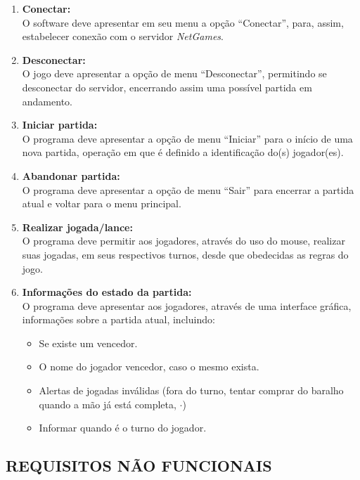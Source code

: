 \documentclass[12pt,a4paper,brazil,abntex2]{article}
\begin{document}
		\begin{enumerate}
			\item {\bf Conectar:}\\
				O software deve apresentar em seu menu a opção ``Conectar'', para, assim, estabelecer conexão com o servidor \textit{NetGames}.

			\item {\bf Desconectar:}\\
				O jogo deve apresentar a opção de menu ``Desconectar'', permitindo se desconectar do servidor, encerrando assim uma possível partida em andamento.
			
			\item {\bf Iniciar partida:}\\
				O programa deve apresentar a opção de menu ``Iniciar'' para o início de uma nova partida, operação em que é definido a identificação do(s) jogador(es).
			
			\item {\bf Abandonar partida:}\\
				O programa deve apresentar a opção de menu ``Sair'' para encerrar a partida atual e voltar para o menu principal.

			\item {\bf Realizar jogada/lance:}\\
				O programa deve permitir aos jogadores, através do uso do mouse, realizar suas jogadas, em seus respectivos turnos, desde que obedecidas as regras do jogo.
			
			\item {\bf Informações do estado da partida:}\\
				O programa deve apresentar aos jogadores, através de uma interface gráfica, informações sobre a partida atual, incluindo:
					\begin{itemize}
						\item Se existe um vencedor.
						\item O nome do jogador vencedor, caso o mesmo exista.
						\item Alertas de jogadas inválidas (fora do turno, tentar comprar do baralho quando a mão já está completa, $\cdot$)
						\item Informar quando é o turno do jogador.
					\end{itemize}
			
		\end{enumerate}
		
	\subsection{\normalsize REQUISITOS NÃO FUNCIONAIS}
		
\end{document}
